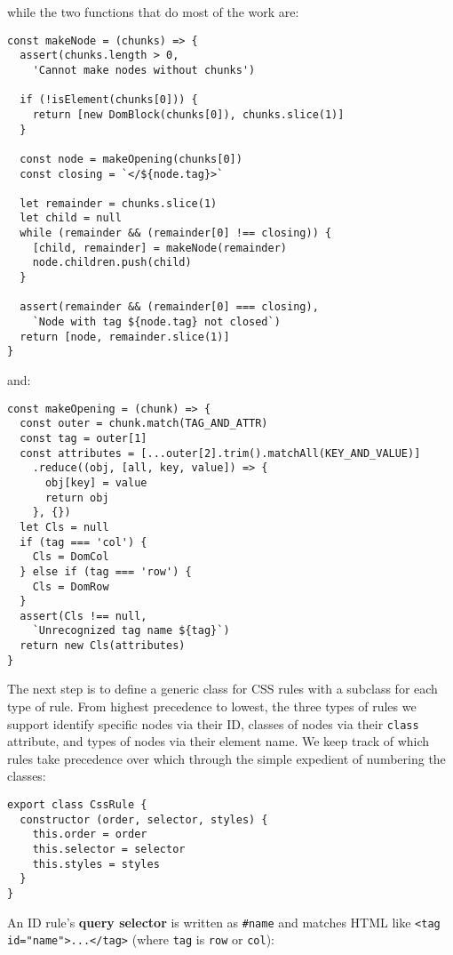 \documentclass[krantzl]{krantz}
\newcommand{\glossref}[1]{\textbf{#1}}
\begin{document}
\noindent while the two functions that do most of the work are:


\begin{lstlisting}[frame=tblr]
const makeNode = (chunks) => {
  assert(chunks.length > 0,
    'Cannot make nodes without chunks')

  if (!isElement(chunks[0])) {
    return [new DomBlock(chunks[0]), chunks.slice(1)]
  }

  const node = makeOpening(chunks[0])
  const closing = `</${node.tag}>`

  let remainder = chunks.slice(1)
  let child = null
  while (remainder && (remainder[0] !== closing)) {
    [child, remainder] = makeNode(remainder)
    node.children.push(child)
  }

  assert(remainder && (remainder[0] === closing),
    `Node with tag ${node.tag} not closed`)
  return [node, remainder.slice(1)]
}
\end{lstlisting}



\noindent and:


\begin{lstlisting}[frame=tblr]
const makeOpening = (chunk) => {
  const outer = chunk.match(TAG_AND_ATTR)
  const tag = outer[1]
  const attributes = [...outer[2].trim().matchAll(KEY_AND_VALUE)]
    .reduce((obj, [all, key, value]) => {
      obj[key] = value
      return obj
    }, {})
  let Cls = null
  if (tag === 'col') {
    Cls = DomCol
  } else if (tag === 'row') {
    Cls = DomRow
  }
  assert(Cls !== null,
    `Unrecognized tag name ${tag}`)
  return new Cls(attributes)
}
\end{lstlisting}



The next step is to define a generic class for CSS rules
with a subclass for each type of rule.
From highest precedence to lowest,
the three types of rules we support identify specific nodes via their ID,
classes of nodes via their \texttt{class} attribute,
and types of nodes via their element name.
We keep track of which rules take precedence over which through the simple expedient of numbering the classes:


\begin{lstlisting}[frame=tblr]
export class CssRule {
  constructor (order, selector, styles) {
    this.order = order
    this.selector = selector
    this.styles = styles
  }
}
\end{lstlisting}



An ID rule’s \glossref{query selector} is written as \texttt{\#name}
and matches HTML like \texttt{<tag id="name">...</tag>} (where \texttt{tag} is \texttt{row} or \texttt{col}):
\end{document}
